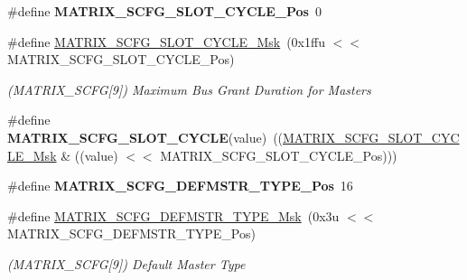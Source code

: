 \begin{DoxyCompactItemize}
\mbox{\label{group__SAMS70__MATRIX_ga8381ea5ca099fd27ca8fbfca54c4a8b3}} 
\#define {\bfseries M\+A\+T\+R\+I\+X\+\_\+\+S\+C\+F\+G\+\_\+\+S\+L\+O\+T\+\_\+\+C\+Y\+C\+L\+E\+\_\+\+Pos}~0
\item 
\mbox{\label{group__SAMS70__MATRIX_ga1ec2b1d65bfe56e014a9e9ea6bd81eb6}} 
\#define \mbox{\hyperlink{group__SAMS70__MATRIX_ga1ec2b1d65bfe56e014a9e9ea6bd81eb6}{M\+A\+T\+R\+I\+X\+\_\+\+S\+C\+F\+G\+\_\+\+S\+L\+O\+T\+\_\+\+C\+Y\+C\+L\+E\+\_\+\+Msk}}~(0x1ffu $<$$<$ M\+A\+T\+R\+I\+X\+\_\+\+S\+C\+F\+G\+\_\+\+S\+L\+O\+T\+\_\+\+C\+Y\+C\+L\+E\+\_\+\+Pos)
\begin{DoxyCompactList}\small\item\em (M\+A\+T\+R\+I\+X\+\_\+\+S\+C\+FG\mbox{[}9\mbox{]}) Maximum Bus Grant Duration for Masters \end{DoxyCompactList}\item 
\mbox{\label{group__SAMS70__MATRIX_ga61b5ffaeb4d72e689d101d1df7138c32}} 
\#define {\bfseries M\+A\+T\+R\+I\+X\+\_\+\+S\+C\+F\+G\+\_\+\+S\+L\+O\+T\+\_\+\+C\+Y\+C\+LE}(value)~((\mbox{\hyperlink{group__SAMV71__MATRIX_ga1ec2b1d65bfe56e014a9e9ea6bd81eb6}{M\+A\+T\+R\+I\+X\+\_\+\+S\+C\+F\+G\+\_\+\+S\+L\+O\+T\+\_\+\+C\+Y\+C\+L\+E\+\_\+\+Msk}} \& ((value) $<$$<$ M\+A\+T\+R\+I\+X\+\_\+\+S\+C\+F\+G\+\_\+\+S\+L\+O\+T\+\_\+\+C\+Y\+C\+L\+E\+\_\+\+Pos)))
\item 
\mbox{\label{group__SAMS70__MATRIX_ga064f806803d17d584f751dfdfbff59be}} 
\#define {\bfseries M\+A\+T\+R\+I\+X\+\_\+\+S\+C\+F\+G\+\_\+\+D\+E\+F\+M\+S\+T\+R\+\_\+\+T\+Y\+P\+E\+\_\+\+Pos}~16
\item 
\mbox{\label{group__SAMS70__MATRIX_gae095872b0c604d21a97b49e765aa007a}} 
\#define \mbox{\hyperlink{group__SAMS70__MATRIX_gae095872b0c604d21a97b49e765aa007a}{M\+A\+T\+R\+I\+X\+\_\+\+S\+C\+F\+G\+\_\+\+D\+E\+F\+M\+S\+T\+R\+\_\+\+T\+Y\+P\+E\+\_\+\+Msk}}~(0x3u $<$$<$ M\+A\+T\+R\+I\+X\+\_\+\+S\+C\+F\+G\+\_\+\+D\+E\+F\+M\+S\+T\+R\+\_\+\+T\+Y\+P\+E\+\_\+\+Pos)
\begin{DoxyCompactList}\small\item\em (M\+A\+T\+R\+I\+X\+\_\+\+S\+C\+FG\mbox{[}9\mbox{]}) Default Master Type \end{DoxyCompactList}\item 
$$
\end{DoxyCompactItemize}
